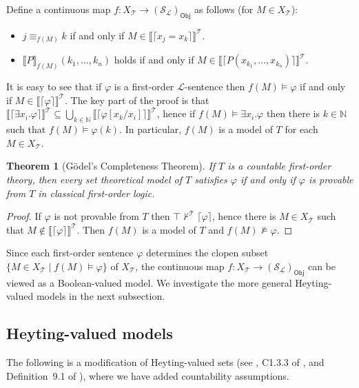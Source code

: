 \documentclass{article}
\theoremstyle{plain}
\newtheorem{theorem}[Theorem]{Theorem}
\def\cal#1{{\mathcal #1}}
\def\IN{{\mathbb N}}
\def\calL{{\cal L}}
\def\calS{{\cal S}}
\def\calT{{\cal T}}
\newcommand{\Obj}{\mathsf{Obj}}
\def\token#1{\lceil#1\rceil}
\begin{document}
Define a continuous map $f\colon X_\calT \to (\calS_\calL)_\Obj$ as follows (for $M\in X_\calT$):
\begin{itemize}
\item
$j \equiv_{f(M)} k$ if and only if $M \in \llbracket\token{x_j = x_k}\rrbracket^\calT$.
\item
$\llbracket P \rrbracket_{f(M)}(k_1,\ldots,k_n)$ holds if and only if $M \in \llbracket \token{P(x_{k_1},\ldots,x_{k_n}) }\rrbracket^\calT$.
\end{itemize}
It is easy to see that if $\varphi$ is a first-order $\calL$-sentence then $f(M) \vDash \varphi$ if and only if $M\in\llbracket \token{\varphi}\rrbracket^\calT$. The key part of the proof is that $\llbracket \token{\exists x_i.\varphi}\rrbracket^\calT \subseteq \bigcup_{k\in\IN} \llbracket \token{\varphi[x_k/x_i]}\rrbracket^\calT$, hence if $f(M) \vDash \exists x_i.\varphi$ then there is $k\in\IN$ such that $f(M)\vDash \varphi(k)$. In particular, $f(M)$ is a model of $T$ for each $M\in X_\calT$.

\begin{theorem}[G\"{o}del's Completeness Theorem]
If $T$ is a countable first-order theory, then every set theoretical model of $T$ satisfies $\varphi$ if and only if $\varphi$ is provable from $T$ in classical first-order logic.
\end{theorem}
\begin{proof}
If $\varphi$ is not provable from $T$ then $\top\not\vdash^\calT \token{\varphi}$, hence there is $M\in X_\calT$ such that $M\not\in \llbracket\token{\varphi}\rrbracket^\calT$. Then $f(M)$ is a model of $T$ and $f(M) \not\vDash \varphi$. 
\end{proof}

Since each first-order sentence $\varphi$ determines the clopen subset $\{M\in X_\calT \mid f(M)\vDash \varphi\}$ of $X_\calT$, the continuous map $f\colon X_\calT \to (\calS_\calL)_\Obj$ can be viewed as a Boolean-valued model. We investigate the more general Heyting-valued models in the next subsection.




\subsection{Heyting-valued models}

The following is a modification of Heyting-valued sets (see \cite{FS79}, C1.3.3 of \cite{J02},  and Definition~9.1 of \cite{S08}), where we have added countability assumptions.
\end{document}
